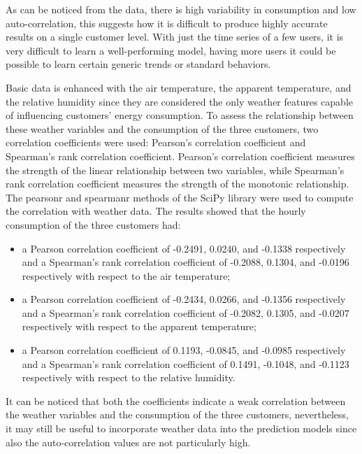 As can be noticed from the data, there is high variability in consumption and low auto-correlation, this suggests how it is difficult to produce highly accurate results on a single customer level.
With just the time series of a few users, it is very difficult to learn a well-performing model, having more users it could be possible to learn certain generic trends or standard behaviors.

Basic data is enhanced with the air temperature, the apparent temperature, and the relative humidity since they are considered the only weather features capable of influencing customers' energy consumption.
To assess the relationship between these weather variables and the consumption of the three customers, two correlation coefficients were used: Pearson's correlation coefficient and Spearman's rank correlation coefficient.
Pearson's correlation coefficient measures the strength of the linear relationship between two variables, while Spearman's rank correlation coefficient measures the strength of the monotonic relationship.
The pearsonr and spearmanr methods of the SciPy library were used to compute the correlation with weather data.
The results showed that the hourly consumption of the three customers had:
\begin{itemize}
  \item a Pearson correlation coefficient of -0.2491, 0.0240, and -0.1338 respectively and a Spearman's rank correlation coefficient of -0.2088, 0.1304, and -0.0196 respectively with respect to the air temperature;
  \item a Pearson correlation coefficient of -0.2434, 0.0266, and -0.1356 respectively and a Spearman's rank correlation coefficient of -0.2082, 0.1305, and -0.0207 respectively with respect to the apparent temperature;
  \item a Pearson correlation coefficient of 0.1193, -0.0845, and -0.0985 respectively and a Spearman's rank correlation coefficient of 0.1491, -0.1048, and -0.1123 respectively with respect to the relative humidity.
\end{itemize}
It can be noticed that both the coefficients indicate a weak correlation between the weather variables and the consumption of the three customers, nevertheless, it may still be useful to incorporate weather data into the prediction models since also the auto-correlation values are not particularly high.

